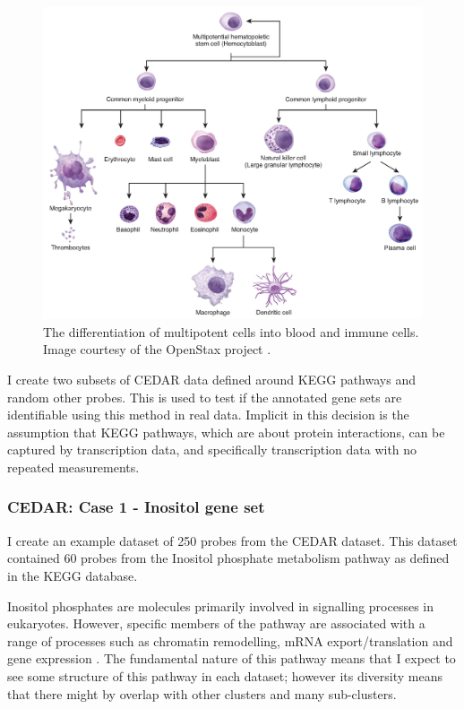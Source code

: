 \documentclass[12pt]{article} %
\begin{document}
	\begin{figure}[h]
		\centering
		\includegraphics[scale=0.75]{Images/white_blood_cell_differentiation.jpg}
		\caption{The differentiation of multipotent cells into blood and immune cells. Image courtesy of the OpenStax project \citep{OpenStaxAnatomyPhysiology2016}.}
		\label{fig:white_blood_cell_differentiation}
	\end{figure}

	 I create two subsets of CEDAR data defined around KEGG pathways and random other probes. This is used to test if the annotated gene sets are identifiable using this method in real data. Implicit in this decision is the assumption that KEGG pathways, which are about protein interactions, can be captured by transcription data, and specifically transcription data with no repeated measurements. 
	 

	 \subsubsection{CEDAR: Case 1 - Inositol gene set} \label{sec:case_studies:cedar:dataset_1}

	I create an example dataset of 250 probes from the CEDAR dataset. This dataset contained 60 probes from the Inositol phosphate metabolism pathway as defined in the KEGG database.
	
	Inositol phosphates are molecules primarily involved in signalling processes in eukaryotes. However, specific members of the pathway are associated with a range of processes such as chromatin remodelling, mRNA export/translation and gene expression \citep{monserrate2010inositol}. The fundamental nature of this pathway means that I expect to see some structure of this pathway in each dataset; however its diversity means that there might by overlap with other clusters and many sub-clusters.
	
\end{document}
